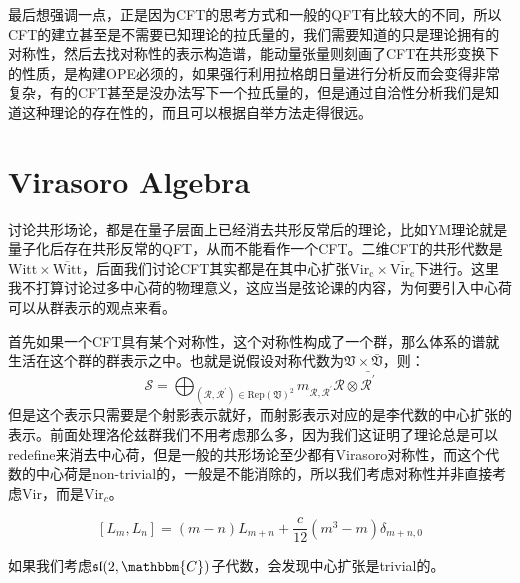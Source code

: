 最后想强调一点，正是因为CFT的思考方式和一般的QFT有比较大的不同，所以CFT的建立甚至是不需要已知理论的拉氏量的，我们需要知道的只是理论拥有的对称性，然后去找对称性的表示构造谱，能动量张量则刻画了CFT在共形变换下的性质，是构建OPE必须的，如果强行利用拉格朗日量进行分析反而会变得非常复杂，有的CFT甚至是没办法写下一个拉氏量的，但是通过自洽性分析我们是知道这种理论的存在性的，而且可以根据自举方法走得很远。

\section{Virasoro Algebra}
讨论共形场论，都是在量子层面上已经消去共形反常后的理论，比如YM理论就是量子化后存在共形反常的QFT，从而不能看作一个CFT。二维CFT的共形代数是$\mathrm{Witt}\times\overline{\mathrm{Witt}}$，后面我们讨论CFT其实都是在其中心扩张$\mathrm{Vir_c}\times\overline{\mathrm{Vir_c}}$下进行。这里我不打算讨论过多中心荷的物理意义，这应当是弦论课的内容，为何要引入中心荷可以从群表示的观点来看。

首先如果一个CFT具有某个对称性，这个对称性构成了一个群，那么体系的谱就生活在这个群的群表示之中。也就是说假设对称代数为$\mathfrak{V}\times\bar{\mathfrak{V}}$，则：
\begin{equation}
	\boxed{\mathcal{S}=\bigoplus_{(\mathcal{R},\mathcal{R}^{\prime})\in\mathrm{Rep}(\mathfrak{V})^2}m_{\mathcal{R},\mathcal{R}^{\prime}}\mathcal{R}\otimes\bar{\mathcal{R}^{\prime}}}
\end{equation}
但是这个表示只需要是个射影表示就好，而射影表示对应的是李代数的中心扩张的表示。前面处理洛伦兹群我们不用考虑那么多，因为我们这证明了理论总是可以redefine来消去中心荷，但是一般的共形场论至少都有Virasoro对称性，而这个代数的中心荷是non-trivial的，一般是不能消除的，所以我们考虑对称性并非直接考虑$\mathrm{Vir}$，而是$\mathrm{Vir}_c$。
\begin{theorem}
	\begin{equation}
		\boxed{
		\left[L_m,L_n\right]=\left(m-n\right)L_{m+n}+\frac c{12}\left(m^3-m\right)\delta_{m+n,0}
		}
	\end{equation}
\end{theorem}
\begin{remark}
	如果我们考虑$\mathfrak{sl}(2,\mathbbm{C})$子代数，会发现中心扩张是trivial的。
\end{remark}
